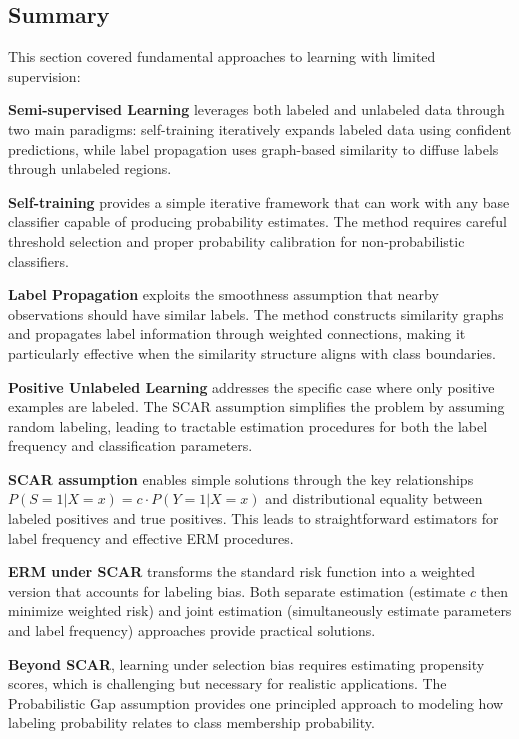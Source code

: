 \documentclass[12pt,a4paper]{article}
\begin{document}
\subsection{Summary}

This section covered fundamental approaches to learning with limited supervision:

\textbf{Semi-supervised Learning} leverages both labeled and unlabeled data through two main paradigms: self-training iteratively expands labeled data using confident predictions, while label propagation uses graph-based similarity to diffuse labels through unlabeled regions.

\textbf{Self-training} provides a simple iterative framework that can work with any base classifier capable of producing probability estimates. The method requires careful threshold selection and proper probability calibration for non-probabilistic classifiers.

\textbf{Label Propagation} exploits the smoothness assumption that nearby observations should have similar labels. The method constructs similarity graphs and propagates label information through weighted connections, making it particularly effective when the similarity structure aligns with class boundaries.

\textbf{Positive Unlabeled Learning} addresses the specific case where only positive examples are labeled. The SCAR assumption simplifies the problem by assuming random labeling, leading to tractable estimation procedures for both the label frequency and classification parameters.

\textbf{SCAR assumption} enables simple solutions through the key relationships $P(S = 1|X = x) = c \cdot P(Y = 1|X = x)$ and distributional equality between labeled positives and true positives. This leads to straightforward estimators for label frequency and effective ERM procedures.

\textbf{ERM under SCAR} transforms the standard risk function into a weighted version that accounts for labeling bias. Both separate estimation (estimate $c$ then minimize weighted risk) and joint estimation (simultaneously estimate parameters and label frequency) approaches provide practical solutions.

\textbf{Beyond SCAR}, learning under selection bias requires estimating propensity scores, which is challenging but necessary for realistic applications. The Probabilistic Gap assumption provides one principled approach to modeling how labeling probability relates to class membership probability.
\end{document}
